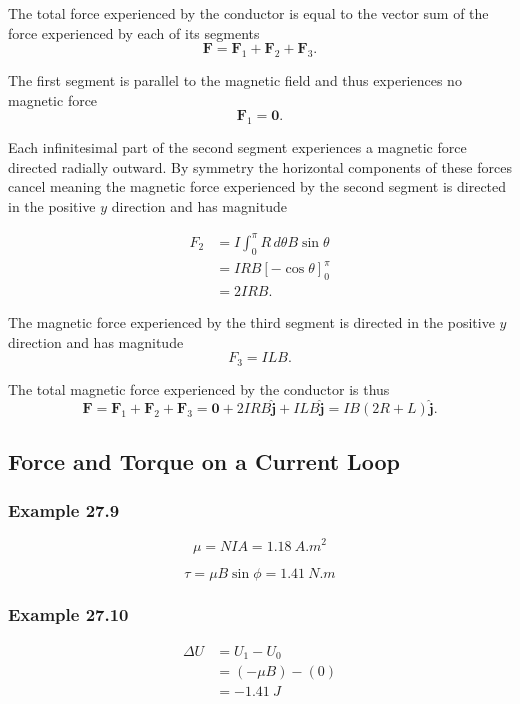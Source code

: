 \documentclass{article}
\begin{document}
The total force experienced by the conductor is equal to the vector sum of the force experienced by each of its segments \[\mathbf{F} = \mathbf{F}_1 + \mathbf{F}_2 + \mathbf{F}_3.\]

The first segment is parallel to the magnetic field and thus experiences no magnetic force \[\mathbf{F}_1 = \mathbf{0}.\]

Each infinitesimal part of the second segment experiences a magnetic force directed radially outward. By symmetry the horizontal components of these forces cancel meaning the magnetic force experienced by the second segment is directed in the positive $y$ direction and has magnitude

\begin{align*}
  F_2 & = I \int_0^\pi R \,d \theta B \sin \theta \\
      & = I R B [-\cos \theta]_0^\pi              \\
      & = 2 I R B.
\end{align*}

The magnetic force experienced by the third segment is directed in the positive $y$ direction and has magnitude \[F_3 = I L B.\]

The total magnetic force experienced by the conductor is thus \[\mathbf{F} = \mathbf{F}_1 + \mathbf{F}_2 + \mathbf{F}_3 = \mathbf{0} + 2 I R B \hat{\mathbf{j}} + I L B \hat{\mathbf{j}} = I B (2 R + L) \hat{\mathbf{j}}.\]

\subsection{Force and Torque on a Current Loop}

\subsubsection{Example 27.9}

\[\mu = N I A = \qty{1.18}{A.m^2}\]

\[\tau = \mu B \sin \phi = \qty{1.41}{N.m}\]

\subsubsection{Example 27.10}

\begin{align*}
  \Delta U & = U_1 - U_0      \\
           & = (-\mu B) - (0) \\
           & = \qty{-1.41}{J}
\end{align*}
\end{document}

